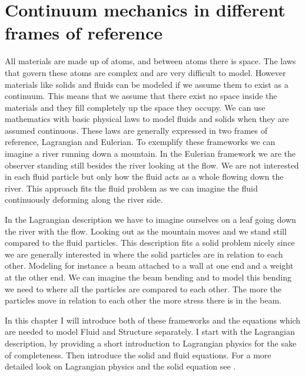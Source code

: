 \chapter{Continuum mechanics in different frames of reference}
All materials are made up of atoms, and between atoms there is space. The laws that govern these atoms are complex and are very difficult to model. However materials like solids and fluids can be modeled if we assume them to exist as a continuum. This means that we assume that there exist no space inside the materials and they fill completely up the space they occupy. 
We can use mathematics with basic physical laws to model fluids and solids when they are assumed continuous. These laws are generally expressed in two frames of reference, Lagrangian and Eulerian. To exemplify these frameworks we can imagine a river running down a mountain. In the Eulerian framework we are the observer standing still besides the river looking at the flow. We are not interested in each fluid particle but only how the fluid acts as a whole flowing down the river. This approach fits the fluid problem as we can imagine the fluid continuously deforming along the river side. \newline

In the Lagrangian description we have to imagine ourselves on a leaf going down the river with the flow. Looking out as the mountain moves and we stand still compared to the fluid particles. This description fits a solid problem nicely since we are generally interested in where the solid particles are in relation to each other. Modeling for instance a beam attached to a wall at one end and a weight at the other end. We can imagine the beam bending and to model this bending we need to where all the particles are compared to each other. The more the particles move in relation to each other the more stress there is in the beam. \newline 

In this chapter I will introduce both of these frameworks and the equations which are needed to model Fluid and Structure separately. I start with the Lagrangian description, by providing a short introduction to Lagrangian physics for the sake of completeness. Then introduce the solid and fluid equations. For a more detailed look on Lagrangian physics and the solid equation see \cite{Holzapfel2000}.





\begin{comment}
Let $\Omega \in \mathbb{R}^d $ for $d \in \{1,2\}$, be a bounded domain with boundary $ \partial \Omega$. The domain is made up of of two sub domains $ \mathcal{F} $ for the fluid domain, and $\mathcal{S}$ for the solid. The interface between the domains are denoted by $ \Sigma = \mathcal{F} \cap \mathcal{S} $. The reference or initial is denoted by $ \hat{\Sigma} = \hat{\mathcal{F}} \cap \hat{\mathcal{S}}  $ 
\end{comment}

